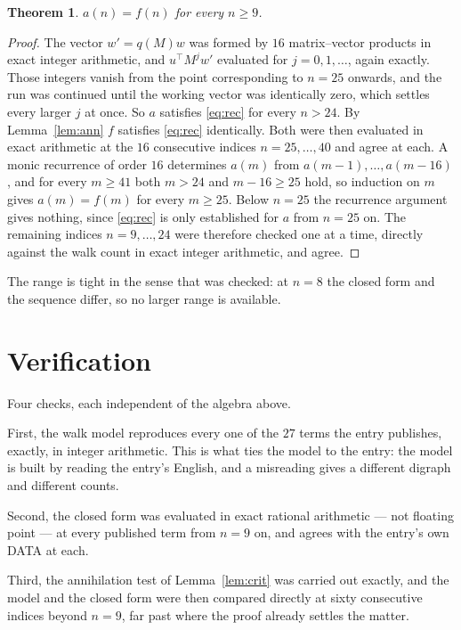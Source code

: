 \documentclass[11pt,a4paper]{article}
\theoremstyle{plain}
\newtheorem{theorem}{Theorem}
\theoremstyle{definition}
\begin{document}
\begin{theorem}
$a(n)=f(n)$ for every $n\ge9$.
\end{theorem}

\begin{proof}
The vector $w'=q(M)w$ was formed by $16$ matrix--vector products in exact integer
arithmetic, and $u^{\!\top}M^{j}w'$ evaluated for $j=0,1,\dots$, again exactly. Those integers
vanish from the point corresponding to $n=25$ onwards, and the run was continued until the
working vector was identically zero, which settles every larger $j$ at once. So $a$ satisfies
\eqref{eq:rec} for every $n>24$. By Lemma~\ref{lem:ann} $f$ satisfies \eqref{eq:rec}
identically. Both were then evaluated in exact arithmetic at the $16$ consecutive indices
$n=25,\dots,40$ and agree at each. A monic recurrence of order $16$
determines $a(m)$ from $a(m-1),\dots,a(m-16)$, and for every $m\ge41$ both
$m>24$ and $m-16\ge25$ hold, so induction on $m$ gives $a(m)=f(m)$ for every
$m\ge25$.
Below $n=25$ the recurrence argument gives nothing, since \eqref{eq:rec} is only
established for $a$ from $n=25$ on. The remaining indices $n=9,\dots,24$ were
therefore checked one at a time, directly against the walk count in exact integer arithmetic,
and agree.
\end{proof}

The range is tight in the sense that was checked: at $n=8$ the closed form and the sequence differ, so no larger range is available.

\section{Verification}

Four checks, each independent of the algebra above.

First, the walk model reproduces every one of the $27$ terms the entry publishes,
exactly, in integer arithmetic. This is what ties the model to the entry: the model is built
by reading the entry's English, and a misreading gives a different digraph and different
counts.

Second, the closed form was evaluated in exact rational arithmetic --- not floating point ---
at every published term from $n=9$ on, and agrees with the entry's own DATA at each.

Third, the annihilation test of Lemma~\ref{lem:crit} was carried out exactly, and the model
and the closed form were then compared directly at sixty consecutive indices beyond
$n=9$, far past where the proof already settles the matter.
\end{document}
